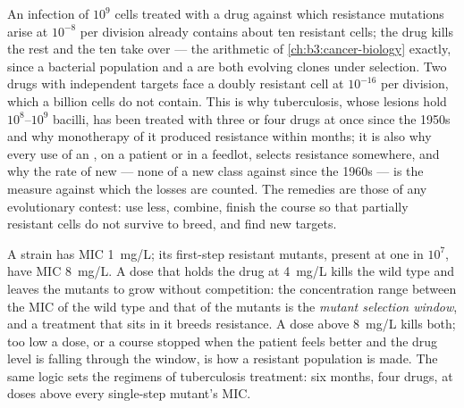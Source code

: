 \begin{proposition}\label{prop:b3:bacteriology:selection}
An infection of $10^{9}$ cells treated with a drug against which
resistance mutations arise at $10^{-8}$ per division already contains
about ten resistant cells; the drug kills the rest and the ten take
over --- the arithmetic of \cref{ch:b3:cancer-biology} exactly, since a
bacterial population and a  are both evolving clones under
selection. Two drugs with independent targets face a doubly resistant
cell at $10^{-16}$ per division, which a billion cells do not contain.
This is why tuberculosis, whose lesions hold $10^{8}$--$10^{9}$ bacilli,
has been treated with three or four drugs at once since the 1950s and
why monotherapy of it produced resistance within months; it is also
why every use of an , on a patient or in a feedlot, selects
resistance somewhere, and why the rate of new  --- none of a
new class against  since the 1960s --- is the measure
against which the losses are counted. The remedies are those of any
evolutionary contest: use less, combine, finish the course so that
partially resistant cells do not survive to breed, and find new
targets.
\end{proposition}

\begin{example}\label{ex:b3:bacteriology:window}
A strain has MIC \qty{1}{mg/L}; its first-step resistant mutants, present
at one in $10^{7}$, have MIC \qty{8}{mg/L}. A dose that holds the drug
at \qty{4}{mg/L} kills the wild type and leaves the mutants to grow
without competition: the concentration range between the MIC of the
wild type and that of the mutants is the \emph{mutant selection
window}, and a treatment that sits in it breeds resistance. A dose
above \qty{8}{mg/L} kills both; too low a dose, or a course stopped when
the patient feels better and the drug level is falling through the
window, is how a resistant population is made. The same logic sets the
regimens of tuberculosis treatment: six months, four drugs, at doses
above every single-step mutant's MIC.
\end{example}

